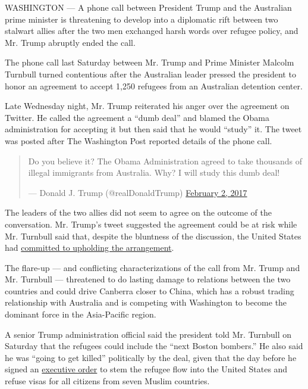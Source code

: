 WASHINGTON --- A phone call between President Trump and the Australian
prime minister is threatening to develop into a diplomatic rift between
two stalwart allies after the two men exchanged harsh words over refugee
policy, and Mr. Trump abruptly ended the call.

The phone call last Saturday between Mr. Trump and Prime Minister
Malcolm Turnbull turned contentious after the Australian leader pressed
the president to honor an agreement to accept 1,250 refugees from an
Australian detention center.

Late Wednesday night, Mr. Trump reiterated his anger over the agreement
on Twitter. He called the agreement a ``dumb deal'' and blamed the Obama
administration for accepting it but then said that he would ``study''
it. The tweet was posted after The Washington Post reported details of
the phone call.

\begin{quote}
Do you believe it? The Obama Administration agreed to take thousands of
illegal immigrants from Australia. Why? I will study this dumb deal!

--- Donald J. Trump (@realDonaldTrump)
\href{https://twitter.com/realDonaldTrump/status/827002559122567168?ref_src=twsrc\%5Etfw}{February
2, 2017}
\end{quote}

The leaders of the two allies did not seem to agree on the outcome of
the conversation. Mr. Trump's tweet suggested the agreement could be at
risk while Mr. Turnbull said that, despite the bluntness of the
discussion, the United States had
\href{https://www.nytimes.com/2017/01/30/world/australia/trump-us-refugee-manus-nauru.html}{committed
to upholding the arrangement}.

The flare-up --- and conflicting characterizations of the call from Mr.
Trump and Mr. Turnbull --- threatened to do lasting damage to relations
between the two countries and could drive Canberra closer to China,
which has a robust trading relationship with Australia and is competing
with Washington to become the dominant force in the Asia-Pacific region.

A senior Trump administration official said the president told Mr.
Turnbull on Saturday that the refugees could include the ``next Boston
bombers.'' He also said he was ``going to get killed'' politically by
the deal, given that the day before he signed an
\href{https://www.nytimes.com/2017/01/27/us/politics/trump-syrian-refugees.html}{executive
order} to stem the refugee flow into the United States and refuse visas
for all citizens from seven Muslim countries.

